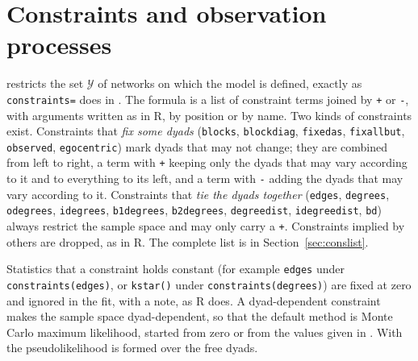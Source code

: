 \section{Constraints and observation processes}\label{sec:constraints}

 restricts the set $\mathcal{Y}$ of networks on which the model is defined, exactly as \texttt{constraints=} does in \ergm{}. The formula is a list of constraint terms joined by \texttt{+} or \texttt{-}, with arguments written as in R, by position or by name. Two kinds of constraints exist. Constraints that \emph{fix some dyads} (\texttt{blocks}, \texttt{blockdiag}, \texttt{fixedas}, \texttt{fixallbut}, \texttt{observed}, \texttt{egocentric}) mark dyads that may not change; they are combined from left to right, a term with \texttt{+} keeping only the dyads that may vary according to it and to everything to its left, and a term with \texttt{-} adding the dyads that may vary according to it. Constraints that \emph{tie the dyads together} (\texttt{edges}, \texttt{degrees}, \texttt{odegrees}, \texttt{idegrees}, \texttt{b1degrees}, \texttt{b2degrees}, \texttt{degreedist}, \texttt{idegreedist}, \texttt{bd}) always restrict the sample space and may only carry a \texttt{+}. Constraints implied by others are dropped, as in R. The complete list is in Section~\ref{sec:conslist}.

Statistics that a constraint holds constant (for example \texttt{edges} under \texttt{constraints(edges)}, or \texttt{kstar()} under \texttt{constraints(degrees)}) are fixed at zero and ignored in the fit, with a note, as R does. A dyad-dependent constraint makes the sample space dyad-dependent, so that the default method is Monte Carlo maximum likelihood, started from zero or from the values given in . With  the pseudolikelihood is formed over the free dyads.

